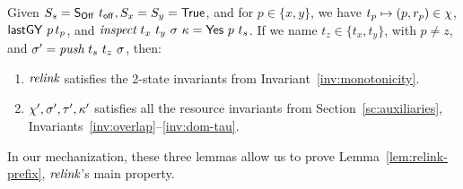 

\begin{lemma}\label{lem:push}
Given $S_s = \mathsf{S_{Off}}\ t_{\mathsf{off}}, S_x = S_y =\mathsf{True}$, and for $p \in \{x,y\}$,
we have $t_p \mapsto (p, r_p) \in \chi$, $ \mathsf{lastGY}\ p\, t_p$, and
{$\aux{inspect}\ t_x\ t_y\ \ordlist\ \C = {\sf Yes}\ p\ t_s$}. If we
name $t_z \in \{ t_x, t_y\}$, with $p \neq z$, and $\sigma' =
\textit{push}\ t_s\ t_z\ \sigma$, then:
\begin{enumerate}
 \item $\textit{relink}$ satisfies the 2-state invariants from
   Invariant~\ref{inv:monotonicity}.
\item $\chi', \sigma', \tau', \kappa'$ satisfies all the resource
  invariants from Section~\ref{sc:auxiliaries}, \ie
  Invariants~\ref{inv:overlap}--\ref{inv:dom-tau}.
\end{enumerate}
\end{lemma}

In our mechanization, these three lemmas allow us to prove
Lemma~\ref{lem:relink-prefix}, $\textit{relink}$'s main property.
